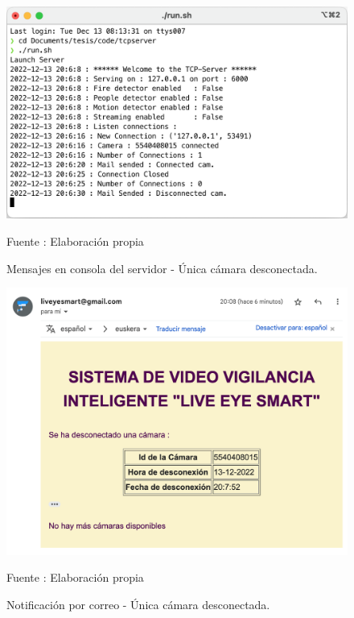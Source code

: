 \begin{figure}[H]
    \begin{center}
        \includegraphics[width=12cm]{img/capitulo_6/cam_disconnected_1_cam.png}
    \end{center}
    \begin{center}
        \caption{Mensajes en consola del servidor - Única cámara desconectada.}
        Fuente : Elaboración propia
    \end{center}
\end{figure}

\begin{figure}[H]
    \begin{center}
        \includegraphics[width=12cm]{img/capitulo_6/mail4.png}
    \end{center}
    \begin{center}
        \caption{Notificación por correo - Única cámara desconectada.}
        Fuente : Elaboración propia
    \end{center}
\end{figure}

